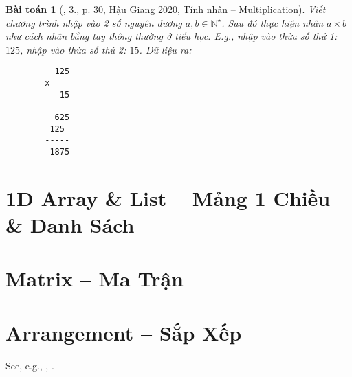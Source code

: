 \documentclass{article}
\newtheorem{baitoan}{Bài toán}
\begin{document}
\begin{baitoan}[\cite{VietSTEM2021}, 3., p. 30, Hậu Giang 2020, Tính nhân -- Multiplication]
	Viết chương trình nhập vào 2 số nguyên dương $a,b\in\mathbb{N}^\star$. Sau đó thực hiện nhân $a\times b$ như cách nhân bằng tay thông thường ở tiểu học. E.g., nhập vào thừa số thứ 1: $125$, nhập vào thừa số thứ 2: $15$. {\sf Dữ liệu ra:}
	\begin{verbatim}
		  125
		x
		   15
		-----
		  625
		 125
		-----
		 1875
	\end{verbatim}
\end{baitoan}


\section{1D Array \& List -- Mảng 1 Chiều \& Danh Sách}


\section{Matrix -- Ma Trận}


\section{Arrangement -- Sắp Xếp}
See, e.g., \cite[Chap. 5: Sorting]{Knuth1998}, \cite[Chap. II, Sect. Dạng bài sắp xếp]{VietSTEM2021}.
\end{document}
